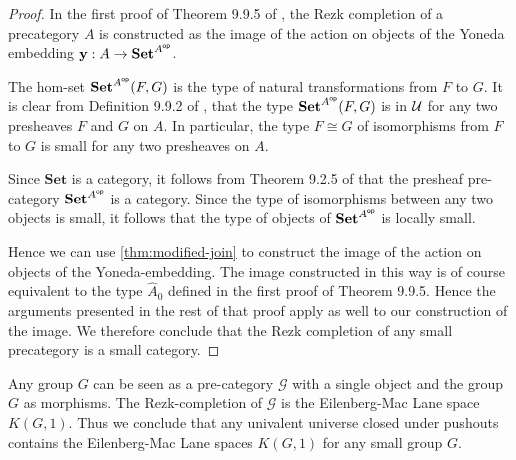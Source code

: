 \begin{proof}
In the first proof of Theorem 9.9.5 of \cite{hottbook}, the Rezk completion of
a precategory $A$ is constructed as the image of the action on objects of the
Yoneda embedding $\mathbf{y}:A\to\mathbf{Set}^{{{A}^\mathsf{op}}}$.

The hom-set $\mathbf{Set}^{{{A}^\mathsf{op}}}(F,G)$ is the type of natural transformations
from $F$ to $G$. It is clear from Definition 9.9.2 of \cite{hottbook}, that the
type $\mathbf{Set}^{{{A}^\mathsf{op}}}(F,G)$ is in $\mathcal{U}$ for any two presheaves $F$ and $G$
on $A$. In particular, the type $F\cong G$ of isomorphisms from $F$ to $G$
is small for any two presheaves on $A$.

Since $\mathbf{Set}$ is a category, it follows from Theorem 9.2.5 of
\cite{hottbook} that the presheaf pre-category $\mathbf{Set}^{{{A}^\mathsf{op}}}$ is a category.
Since the type of isomorphisms between any two objects is
small, it follows that the type of objects of
$\mathbf{Set}^{{{A}^\mathsf{op}}}$ is locally small. 

Hence we can use \autoref{thm:modified-join} to construct the image of the
action on objects of the Yoneda-embedding. The image constructed in this way
is of course equivalent to the type $\hat{A}_0$ defined in the first proof of
Theorem 9.9.5. Hence the arguments presented in the rest of that proof apply
as well to our construction of the image. We therefore conclude that the Rezk completion
of any small precategory is a small category.
\end{proof}

\begin{eg}\label{eg:emspaces}
Any group $G$ can be seen as a pre-category $\mathcal{G}$ with a single object and the group $G$ as morphisms. The Rezk-completion of $\mathcal{G}$ is the Eilenberg-Mac Lane space $K(G,1)$. Thus we conclude that any univalent universe closed under pushouts contains the Eilenberg-Mac Lane spaces $K(G,1)$ for any small group $G$. 
\end{eg}
